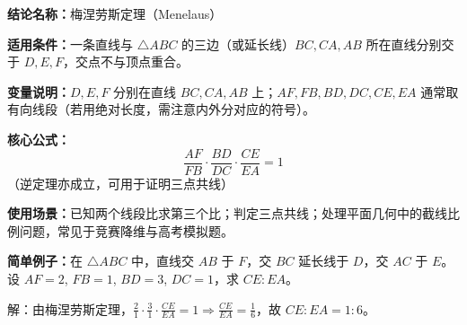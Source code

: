 \textbf{结论名称：}梅涅劳斯定理（Menelaus）\par  
\textbf{适用条件：}一条直线与 $\triangle ABC$ 的三边（或延长线）$BC,CA,AB$ 所在直线分别交于 $D,E,F$，交点不与顶点重合。\par  
\textbf{变量说明：}$D,E,F$ 分别在直线 $BC,CA,AB$ 上；$AF,FB,BD,DC,CE,EA$ 通常取有向线段（若用绝对长度，需注意内外分对应的符号）。\par  
\textbf{核心公式：}\[\boxed{\frac{AF}{FB}\cdot\frac{BD}{DC}\cdot\frac{CE}{EA}=1}\]（逆定理亦成立，可用于证明三点共线）\par  
\textbf{使用场景：}已知两个线段比求第三个比；判定三点共线；处理平面几何中的截线比例问题，常见于竞赛降维与高考模拟题。\par  
\textbf{简单例子：}在 $\triangle ABC$ 中，直线交 $AB$ 于 $F$，交 $BC$ 延长线于 $D$，交 $AC$ 于 $E$。设 $AF=2$, $FB=1$, $BD=3$, $DC=1$，求 $CE:EA$。\par  
解：由梅涅劳斯定理，$\displaystyle\frac{2}{1}\cdot\frac{3}{1}\cdot\frac{CE}{EA}=1\Rightarrow \frac{CE}{EA}=\frac{1}{6}$，故 $CE:EA=1:6$。